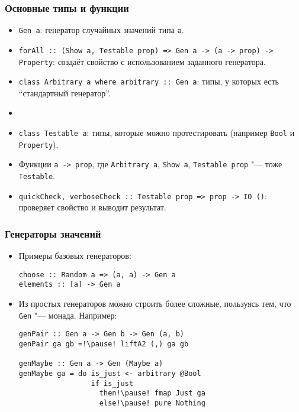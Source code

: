 \documentclass[11pt]{beamer}
\begin{document}
\begin{frame}[fragile]
\frametitle{Основные типы и функции}
\begin{itemize}
    \item \lstinline|Gen a|: генератор случайных значений типа \lstinline|a|.
    \item \lstinline|forAll :: (Show a, Testable prop) => Gen a -> (a -> prop) -> Property|: создаёт свойство с использованием заданного генератора.
    \item \lstinline|class Arbitrary a where arbitrary :: Gen a|: типы, у которых есть \enquote{стандартный генератор}. 
    \item[]
    \item \lstinline|class Testable a|: типы, которые можно протестировать (например \lstinline|Bool| и \lstinline|Property|). 
    \item Функции \lstinline|a -> prop|, где \lstinline|Arbitrary a|, \lstinline|Show a|, \lstinline|Testable prop| "--- тоже \lstinline|Testable|.
    \item \lstinline|quickCheck, verboseCheck :: Testable prop => prop -> IO ()|: проверяет свойство и выводит результат.
\end{itemize}
\end{frame}

\begin{frame}[fragile]
\frametitle{Генераторы значений}
\begin{itemize}
    \item Примеры базовых генераторов:
\begin{lstlisting}[basicstyle=\ttfamily\small]
choose :: Random a => (a, a) -> Gen a
elements :: [a] -> Gen a
\end{lstlisting}
    \item Из простых генераторов можно строить более сложные, пользуясь тем, что \lstinline|Gen| "--- монада. Например:
\begin{lstlisting}[basicstyle=\ttfamily\small]
genPair :: Gen a -> Gen b -> Gen (a, b)
genPair ga gb =!\pause! liftA2 (,) ga gb

genMaybe :: Gen a -> Gen (Maybe a)
genMaybe ga = do is_just <- arbitrary @Bool
                 if is_just 
                   then!\pause! fmap Just ga
                   else!\pause! pure Nothing
\end{lstlisting}
\end{itemize}
\end{frame}
\end{document}

